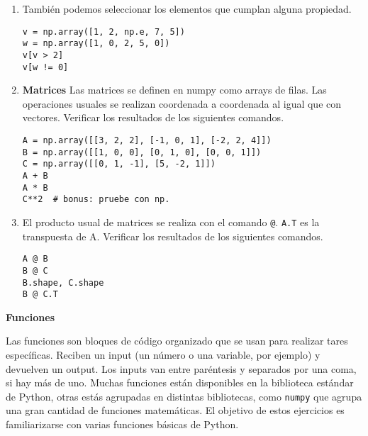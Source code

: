 \documentclass[a4paper,11pt]{article}
\theoremstyle{definition}
\begin{document}
\begin{enumerate}
\item También podemos seleccionar los elementos que cumplan alguna propiedad.
\begin{lstlisting}
v = np.array([1, 2, np.e, 7, 5])
w = np.array([1, 0, 2, 5, 0])
v[v > 2]
v[w != 0]
\end{lstlisting}

\item \textbf{Matrices} Las matrices se definen en numpy como arrays de filas. Las operaciones usuales se realizan coordenada a coordenada al igual que con vectores.
Verificar los resultados de los siguientes comandos.

\begin{lstlisting}
A = np.array([[3, 2, 2], [-1, 0, 1], [-2, 2, 4]])
B = np.array([[1, 0, 0], [0, 1, 0], [0, 0, 1]])
C = np.array([[0, 1, -1], [5, -2, 1]])
A + B
A * B
C**2  # bonus: pruebe con np.
\end{lstlisting}

\item El producto usual de matrices se realiza con el comando \lstinline{@}. \lstinline|A.T| es la transpuesta de A. Verificar los resultados de los siguientes comandos.
\begin{lstlisting}
A @ B
B @ C
B.shape, C.shape
B @ C.T
\end{lstlisting}

\end{enumerate}
\textbf{\large Funciones}

Las funciones son bloques de código organizado que se usan para realizar tares específicas. Reciben un input (un número o una variable, por ejemplo) y devuelven un output. Los inputs van entre paréntesis y separados por una coma, si hay más de uno. Muchas funciones están disponibles en la biblioteca estándar de Python, otras estás agrupadas en distintas bibliotecas, como \lstinline{numpy} que agrupa una gran cantidad de funciones matemáticas. El objetivo de estos ejercicios es familiarizarse con varias funciones básicas de Python.
\end{document}
